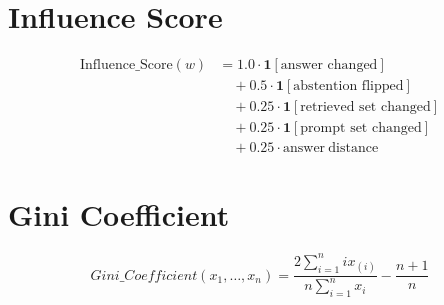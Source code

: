 \documentclass[11pt]{article}
\begin{document}
\section*{Influence Score}

\begin{equation*}
\begin{aligned}
\mathrm{Influence\_Score}(w)
&= 
1.0 \cdot \mathbf{1}[\text{answer changed}]
\\
&\quad + 0.5 \cdot \mathbf{1}[\text{abstention flipped}]
\\
&\quad + 0.25 \cdot \mathbf{1}[\text{retrieved set changed}]
\\
&\quad + 0.25 \cdot \mathbf{1}[\text{prompt set changed}]
\\
&\quad + 0.25 \cdot \mathrm{answer\ distance}
\end{aligned}
\end{equation*}

\section*{Gini Coefficient}

\[
Gini\_Coefficient(x_1,\dots,x_n)
=
\frac{2 \sum_{i=1}^{n} i x_{(i)}}{n \sum_{i=1}^{n} x_i}
- \frac{n+1}{n}
\]
\end{document}
